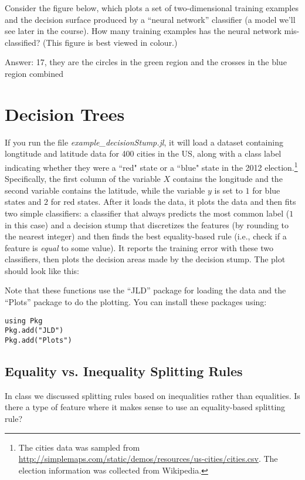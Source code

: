 \documentclass{article}
\def\ans#1{\par\gre{Answer: #1}}
\def\blu#1{{\color{blu}#1}}
\def\gre#1{{\color{gre}#1}}
\newcommand{\centerfig}[2]{\begin{center}\texttt{[image: a1f/\#2]}\end{center}}
\begin{document}
Consider the figure below, which plots a set of two-dimensional training examples and the decision surface produced by a ``neural network'' classifier (a model we'll see later in the course).
\blu{How many training examples has the neural network mis-classified?} (This figure is best viewed in colour.)
\ans{17, they are the circles in the green region and the crosses in the blue region combined}

\pagebreak

\section{Decision Trees}

If you run the file \emph{example\_decisionStump.jl}, it will load a dataset containing longtitude and latitude data for 400 cities in the US, along with a class label indicating whether they were a ``red" state or a ``blue" state in the 2012 election.\footnote{The cities data was sampled from \url{http://simplemaps.com/static/demos/resources/us-cities/cities.csv}. The election information was collected from Wikipedia.} Specifically, the first column of the variable $X$ contains the longitude and the second variable contains the latitude, while the variable $y$ is set to $1$ for blue states and $2$ for red states. After it loads the data, it plots the data and then fits two simple classifiers: a classifier that always predicts the most common label ($1$ in this case) and a decision stump that discretizes the features (by rounding to the nearest integer) and then finds the best equality-based rule (i.e., check if a feature is \emph{equal} to some value). It reports the training error with these two classifiers, then plots the decision areas made by the decision stump. The plot should look like this:

Note that these functions use the ``JLD'' package for loading the data and the ``Plots'' package to do the plotting. You can install these packages using:
\begin{verbatim}
using Pkg
Pkg.add("JLD")
Pkg.add("Plots")
\end{verbatim}

\subsection{Equality vs. Inequality Splitting Rules}

In class we discussed splitting rules based on inequalities rather than equalities. \blu{Is there a type of feature where it makes sense to use
an equality-based splitting rule?}
\end{document}
